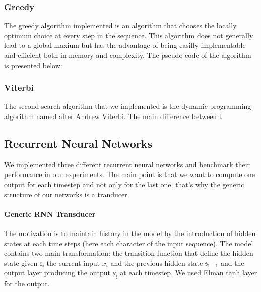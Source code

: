 \documentclass[11pt]{article}
\begin{document}
\subsubsection{Greedy}
The greedy algorithm implemented is an algorithm that chooses the locally optimum choice at every step in the sequence. This algorithm does not generally lead to a global maxium but has the advantage of being easilly implementable and efficient both in memory and complexity. The pseudo-code of the algorithm is presented below:

 \begin{algorithmic}[1]
    \EndFor{}
    \EndProcedure{}
  \end{algorithmic}
\subsubsection{Viterbi}
The second search algorithm that we implemented is the dynamic programming algorithm named after Andrew Viterbi. The main difference between t

\subsection{Recurrent Neural Networks}

We implemented three different recurrent neural networks and benchmark their performance in our experiments. The main point is that we want to compute one output for each timestep and not only for the last one, that's why the generic structure of our networks is a tranducer.

\paragraph{Generic RNN Transducer}

The motivation is to maintain history in the model by the introduction of hidden states at each time steps (here each character of the input sequence). The model contains two main transformation: the transition function that define the hidden state given $\mathbb{s_{i}}$ the current input $x_i$ and the previous hidden state $\mathbb{s_{i-1}}$ and the output layer producing the output $\mathbb{y_i}$ at each timestep. We used Elman tanh layer for the output.
\end{document}
